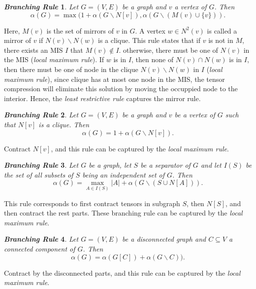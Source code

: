 \documentclass{article}
\newcommand{\<}{\langle}
\renewcommand{\>}{\rangle}
\newtheorem{theorem}{\textit{Branching Rule}}
\theoremstyle{definition}\newtheorem{definition}{\textit{Definition}}
\begin{document}
\begin{theorem} %
Let $G = (V, E)$ be a graph and $v$ a vertex of $G$. Then
\begin{equation}
\alpha(G) = \max(1 + \alpha(G \backslash N[v]), \alpha(G \backslash (M(v) \cup \{v\})).
\end{equation}
\end{theorem}

Here, $M(v)$ is the set of mirrors of $v$ in $G$.
A vertex $w \in N^2(v)$ is called a mirror of $v$ if $N(v) \backslash N(w)$ is a clique.
This rule states that if $v$ is not in $M$, there exists an MIS $I$ that $M(v)\notin I$.
otherwise, there must be one of $N(v)$ in the MIS (\textit{local maximum rule}).
If $w$ is in $I$, then none of $N(v) \cap N(w)$ is in $I$, then there must be one of node in the clique $N(v)\backslash N(w)$ in $I$ (\textit{local maximum rule}),
since clique has at most one node in the MIS, the tensor compression will eliminate this solution by moving the occuppied node to the interior.
Hence, the \textit{least restrictive rule} captures the mirror rule.

\begin{theorem} %
Let $G = (V, E)$ be a graph and $v$ be a vertex of $G$ such that $N[v]$ is a
clique. Then
\begin{equation}
\alpha(G) = 1 + \alpha(G \backslash N[v]).
\end{equation}
\end{theorem}

Contract $N[v]$, and this rule can be captured by the \textit{local maximum rule}.

\begin{theorem}  %
Let $G$ be a graph, let $S$ be a separator of $G$ and let $I(S)$ be the set of
all subsets of $S$ being an independent set of $G$. Then
\begin{equation}
\alpha(G) = \max_{A\in I(S)} |A| + \alpha(G \backslash (S \cup N[A])).
\end{equation}
\end{theorem}
This rule corresponds to first contract tensors in subgraph $S$, then $N[S]$, and then contract the rest parts.
These branching rule can be captured by the \textit{local maximum rule}.

\begin{theorem}  %
Let $G = (V, E)$ be a disconnected graph and $C \subseteq V$ a connected component of $G$. Then
\begin{equation}
\alpha(G) = \alpha(G[C]) + \alpha(G \backslash C)).
\end{equation}
\end{theorem}
Contract by the disconnected parts, and this rule can be captured by the \textit{local maximum rule}.
\end{document}
